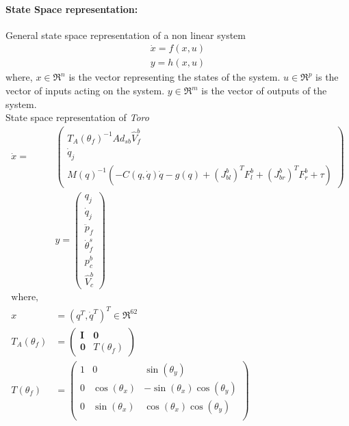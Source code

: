 \documentclass[12pt]{article}
\begin{document}
\paragraph{State Space representation:}
General state space representation of a non linear system
\begin{equation}
\label{eq:dyn_nl}
	\begin{split}
	\dot{x} = f(x,u)\\
	y = h(x,u)
	\end{split}
\end{equation}
where, $x \in \Re^{n}$ is the vector representing the states of the system. $u \in \Re^{p}$ is the vector of inputs acting on the system. $y \in \Re^{m}$ is the vector of outputs of the system.\\
State space representation of \emph{Toro}
\begin{equation}
\label{eq:toro}
	\begin{split}
	\dot{x} = &
	\begin{pmatrix}
	T_{A}(\theta_{f})^{-1}Ad_{sb}\hat{V}_{f}^{b}\\
	\dot{q}_{j}\\
	M(q)^{-1}(-C(q,\dot{q})\dot{q} -g(q) + (J_{bl}^{b})^{T}F_{l}^{b} +(J_{br}^{b})^{T}F_{r}^{b} + \tau)	
	\end{pmatrix}
	\\&	y = 
	\begin{pmatrix}
	q_{j} \\ \dot{q}_{j} \\ \ddot{p}_{f} \\ \dot{\theta}_{f}^{s}\\ p_{c}^{b}\\ \hat{V}_{c}^{b}
	\end{pmatrix}
	\\ \text{where, }\\ x &= (q^{T},\dot{q}^{T})^{T} \in \Re^{62}\\
		T_{A}(\theta_{f}) &=
	\begin{pmatrix}
	\textbf{I} &\textbf{0} \\
	\textbf{0} &T(\theta_{f})
	\end{pmatrix} 
	\\T(\theta_{f}) &=
	\begin{pmatrix}
	1 &0 &\sin(\theta_{y})\\
	0 &\cos(\theta_{x}) &-\sin(\theta_{x})\cos(\theta_{y})\\
	0 &\sin(\theta_{x}) &\cos(\theta_{x})\cos(\theta_{y})\\
	\end{pmatrix}	\\

\end{split}
\end{equation}
\end{document}
